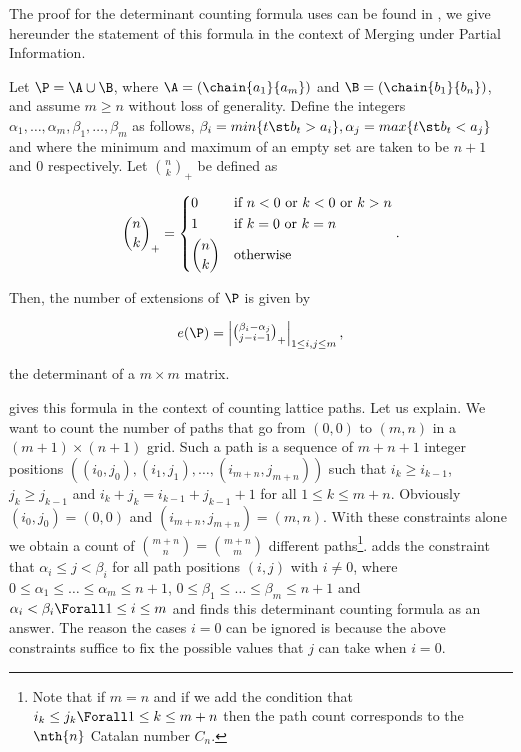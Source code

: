 The proof for the determinant counting formula \citet*{linial:1984} uses can be
found in \citet*{mohanty:1979}, we give hereunder the statement of this formula
in the context of Merging under Partial Information.

\begin{theorem}
Let \(\P = \A \cup \B\), where \(\A = (\chain{a_1}{a_m})\) and \(\B =
(\chain{b_1}{b_n})\), and assume \(m \ge n\) without loss of generality. Define
the integers \(\alpha_1,\ldots,\alpha_m,\beta_1,\ldots,\beta_m\) as follows,
\(\beta_i = min\{t \st b_t > a_i\}, \alpha_j = max\{t \st b_t < a_j\}\) and
where the minimum and maximum of an empty set are taken to be \(n + 1\) and
\(0\) respectively. Let \(\binom{n}{k}_{+}\) be defined as

\begin{displaymath}
\binom{n}{k}_{+} =
\begin{dcases*}
0            & if  \(n < 0\)  or \(k < 0\)  or \(k > n\)\\
1            & if \(k = 0\)  or \(k = n\)\\
\binom{n}{k} & otherwise\\
\end{dcases*}.
\end{displaymath}

Then, the number of extensions of \(\P\) is given by

\begin{displaymath}
e(\P) =
\begin{vmatrix}
\binom{\beta_i - \alpha_j}{j - i - 1}_{+}
\end{vmatrix}_{1 \le i , j \le m},
\end{displaymath}

the determinant of a \(m \times m\) matrix.
\end{theorem}

\citet*{mohanty:1979} gives this formula in the context of counting lattice
paths. Let us explain. We want to count the number of paths that go from
\((0,0)\) to \((m,n)\) in a \((m+1) \times (n+1)\) grid. Such a path is a
sequence of \(m+n+1\) integer positions \(( (i_{0},j_{0}) , (i_{1},j_{1}) ,
\ldots , (i_{m+n},j_{m+n}) )\) such that \(i_{k} \ge i_{k-1}\), \(j_{k} \ge
j_{k-1}\) and \(i_{k} + j_{k} = i_{k-1} + j_{k-1} + 1\) for all \(1 \le k \le m
+ n\).  Obviously \((i_{0},j_{0}) = (0,0)\) and \((i_{m+n},j_{m+n}) = (m,n)\).
With these constraints alone we obtain a count of \(\binom{m+n}{n} =
\binom{m+n}{m} \) different paths\footnote{Note that if \(m = n\) and if we add
the condition that \(i_{k} \le j_{k} \Forall 1 \le k \le m + n\) then the path
count corresponds to the \(\nth{n}\) Catalan number \(C_n\).}.
\citet*{mohanty:1979} adds the constraint that \(\alpha_i \le j < \beta_i\) for
all path positions \((i,j)\) with \(i \neq 0\), where \(0 \le
\alpha_1 \le \ldots \le \alpha_m \le n + 1\), \(0 \le \beta_1 \le \ldots \le
\beta_m \le n + 1\) and \(\alpha_i < \beta_i \Forall 1 \le i \le m\) and finds
this determinant counting formula as an answer. The reason the cases \(i = 0\)
can be ignored is because the above constraints suffice to fix
the possible values that \(j\) can take when \(i = 0\).

